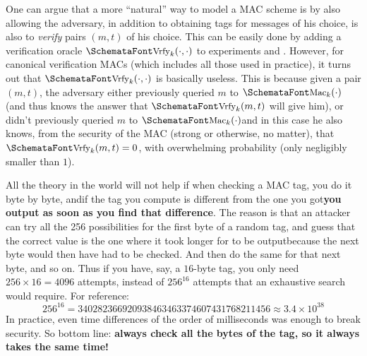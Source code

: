    One can argue that a more ``natural'' way to model a MAC scheme is by also allowing the adversary, in addition to obtaining tags for messages of his choice, is also to \emph{verify} pairs $(m, t)$ of his choice. This can be easily done by adding a verification oracle $\myemph{Vrfy}_k(\cdot, \cdot)$ to experiments  and . However, for canonical verification MACs (which includes all those used in practice), it turns out that $\myemph{Vrfy}_k(\cdot, \cdot)$ is basically useless. This is because given a pair $(m, t)$, the adversary either previously queried $m$ to $\myemph{Mac}_k(\cdot)$ (and thus knows the answer that $\myemph{Vrfy}_k(m, t)$ will give him), or didn't previously queried $m$ to $\myemph{Mac}_k(\cdot)$\emd and in this case he also knows, from the security of the MAC (strong or otherwise, no matter), that $\myemph{Vrfy}_k(m, t) = 0$, with overwhelming probability (only negligibly smaller than $1$).

  \bigskip

   All the theory in the world will not help if when checking a MAC tag, you do it byte by byte, and\emd if the tag you compute is different from the one you got\emd \textbf{you output  as soon as you find that difference}. The reason is that an attacker can try all the 256 possibilities for the first byte of a random tag, and guess that the correct value is the one where it took longer for  to be output\emd because the next byte would then have had to be checked. And then do the same for that next byte, and so on. Thus if you have, say, a $16$-byte tag, you only need $256 \times 16 = 4096$ attempts, instead of $256^{16}$ attempts that an exhaustive search would require. For reference:
  \begin{equation}
    256^{16} = 340282366920938463463374607431768211456 \approx 3.4 \times 10^{38}
  \end{equation}
  In practice, even time differences of the order of milliseconds was enough to break security. So bottom line: \textbf{always check all the bytes of the tag, so it always takes the same time!}

